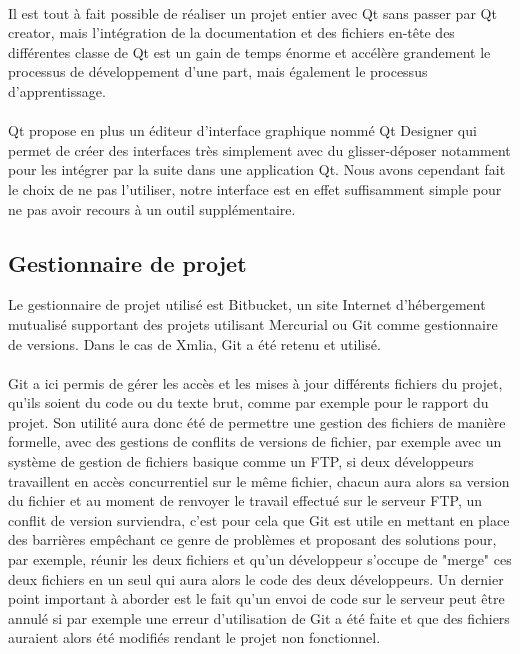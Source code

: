 \paragraph{}
Il est tout à fait possible de réaliser un projet entier avec Qt sans passer par Qt creator, mais l'intégration de la documentation et des fichiers en-tête des différentes classe de Qt est un gain de temps énorme et accélère grandement le processus de développement d'une part, mais également le processus d'apprentissage.
\paragraph{}
Qt propose en plus un éditeur d'interface graphique nommé Qt Designer qui permet de créer des interfaces très simplement avec du glisser-déposer notamment pour les intégrer par la suite dans une application Qt. Nous avons cependant fait le choix de ne pas l'utiliser, notre interface est en effet suffisamment simple pour ne pas avoir recours à un outil supplémentaire.

\subsection{Gestionnaire de projet}
Le gestionnaire de projet utilisé est Bitbucket, un site Internet d'hébergement mutualisé supportant des projets utilisant Mercurial ou Git comme gestionnaire de versions. Dans le cas de Xmlia, Git a été retenu et utilisé.
\paragraph{}
Git a ici permis de gérer les accès et les mises à jour différents fichiers du projet, qu'ils soient du code ou du texte brut, comme par exemple pour le rapport du projet. Son utilité aura donc été de permettre une gestion des fichiers de manière formelle, avec des gestions de conflits de versions de fichier, par exemple avec un système de gestion de fichiers basique comme un FTP, si deux développeurs travaillent en accès concurrentiel sur le même fichier, chacun aura alors sa version du fichier et au moment de renvoyer le travail effectué sur le serveur FTP, un conflit de version surviendra, c'est pour cela que Git est utile en mettant en place des barrières empêchant ce genre de problèmes et proposant des solutions pour, par exemple, réunir les deux fichiers et qu'un développeur s'occupe de "merge" ces deux fichiers en un seul qui aura alors le code des deux développeurs. Un dernier point important à aborder est le fait qu'un envoi de code sur le serveur peut être annulé si par exemple une erreur d'utilisation de Git a été faite et que des fichiers auraient alors été modifiés rendant le projet non fonctionnel.
